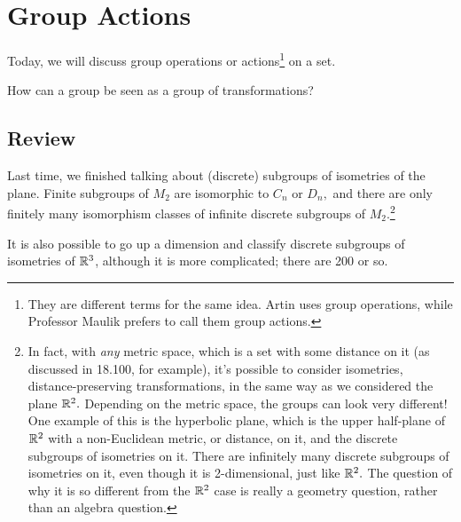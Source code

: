 
\section{Group Actions}

Today, we will discuss group operations or actions\footnote{They are different terms for the same idea. Artin uses group operations, while Professor Maulik prefers to call them group actions.} on a set.
\begin{qq}
How can a group be seen as a group of transformations?%
\end{qq}

\subsection{Review}
Last time, we finished talking about (discrete) subgroups of isometries of the plane. Finite subgroups of $M_2$ are isomorphic to $C_n$ or $D_n,$ and there are only finitely many isomorphism classes of infinite discrete subgroups of $M_2$.\footnote{In fact, with \emph{any} metric space, which is a set with some distance on it (as discussed in 18.100, for example), it's possible to consider isometries, distance-preserving transformations, in the same way as we considered the plane $\mathbb R^2.$ Depending on the metric space, the groups can look very different! One example of this is the hyperbolic plane, which is the upper half-plane of $\mathbb R^2$ with a non-Euclidean metric, or distance, on it, and the discrete subgroups of isometries on it. There are infinitely many discrete subgroups of isometries on it, even though it is 2-dimensional, just like $\mathbb R^2.$ The question of why it is so different from the $\mathbb R^2$ case is really a geometry question, rather than an algebra question.} 

It is also possible to go up a dimension and classify discrete subgroups of isometries of $\mathbb R^3$, although it is more complicated; there are 200 or so. 



